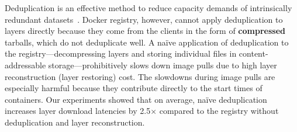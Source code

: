 
Deduplication is an effective method to reduce capacity demands of intrinsically redundant
datasets~\cite{paulo2014survey}.
%
%
%
Docker registry, however, cannot apply deduplication to layers directly 
because they come from the clients in the form of \textbf{compressed} tarballs,
which do not deduplicate well.
%
%
%
A na\"{i}ve application of deduplication to the registry---decompressing
layers and storing individual files in content-addressable storage---prohibitively
slows down image pulls due to high layer reconstruction 
(layer restoring) cost.
%
The slowdowns during image pulls are especially
harmful because they contribute directly to the start times of containers.
%
Our experiments showed that on average, na\"{i}ve deduplication increases layer
download latencies by 2.5$\times$ compared to the registry without deduplication and layer reconstruction.

